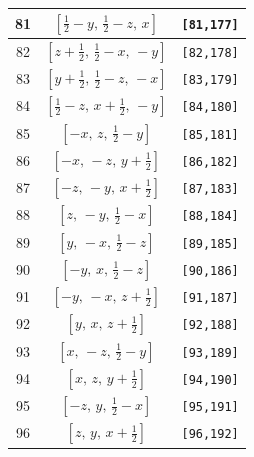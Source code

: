 \documentclass[fleqn,8pt]{jsarticle}
\begin{document}
\begin{longtable}{ccc}
81 & $\left[ \frac{1}{2} - y,\, \frac{1}{2} - z,\, x \right]$ & {\tt [81,177]} \\ \hline
82 & $\left[ z + \frac{1}{2},\, \frac{1}{2} - x,\, - y \right]$ & {\tt [82,178]} \\ \hline
83 & $\left[ y + \frac{1}{2},\, \frac{1}{2} - z,\, - x \right]$ & {\tt [83,179]} \\ \hline
84 & $\left[ \frac{1}{2} - z,\, x + \frac{1}{2},\, - y \right]$ & {\tt [84,180]} \\ \hline
85 & $\left[ - x,\, z,\, \frac{1}{2} - y \right]$ & {\tt [85,181]} \\ \hline
86 & $\left[ - x,\, - z,\, y + \frac{1}{2} \right]$ & {\tt [86,182]} \\ \hline
87 & $\left[ - z,\, - y,\, x + \frac{1}{2} \right]$ & {\tt [87,183]} \\ \hline
88 & $\left[ z,\, - y,\, \frac{1}{2} - x \right]$ & {\tt [88,184]} \\ \hline
89 & $\left[ y,\, - x,\, \frac{1}{2} - z \right]$ & {\tt [89,185]} \\ \hline
90 & $\left[ - y,\, x,\, \frac{1}{2} - z \right]$ & {\tt [90,186]} \\ \hline
91 & $\left[ - y,\, - x,\, z + \frac{1}{2} \right]$ & {\tt [91,187]} \\ \hline
92 & $\left[ y,\, x,\, z + \frac{1}{2} \right]$ & {\tt [92,188]} \\ \hline
93 & $\left[ x,\, - z,\, \frac{1}{2} - y \right]$ & {\tt [93,189]} \\ \hline
94 & $\left[ x,\, z,\, y + \frac{1}{2} \right]$ & {\tt [94,190]} \\ \hline
95 & $\left[ - z,\, y,\, \frac{1}{2} - x \right]$ & {\tt [95,191]} \\ \hline
96 & $\left[ z,\, y,\, x + \frac{1}{2} \right]$ & {\tt [96,192]} \\
\end{longtable}
\end{document}
